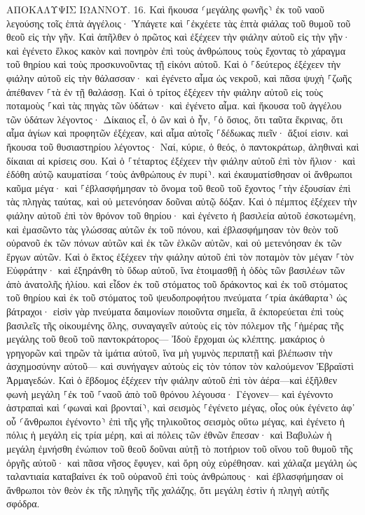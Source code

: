 \documentclass[twoside, 9pt]{extreport}
\begin{document}
ΑΠΟΚΑΛΥΨΙΣ ΙΩΑΝΝΟΥ.
16.
Καὶ ἤκουσα ⸂μεγάλης φωνῆς⸃ ἐκ τοῦ ναοῦ λεγούσης τοῖς ἑπτὰ ἀγγέλοις· Ὑπάγετε καὶ ⸀ἐκχέετε τὰς ἑπτὰ φιάλας τοῦ θυμοῦ τοῦ θεοῦ εἰς τὴν γῆν. 
Καὶ ἀπῆλθεν ὁ πρῶτος καὶ ἐξέχεεν τὴν φιάλην αὐτοῦ εἰς τὴν γῆν· καὶ ἐγένετο ἕλκος κακὸν καὶ πονηρὸν ἐπὶ τοὺς ἀνθρώπους τοὺς ἔχοντας τὸ χάραγμα τοῦ θηρίου καὶ τοὺς προσκυνοῦντας τῇ εἰκόνι αὐτοῦ. 
Καὶ ὁ ⸀δεύτερος ἐξέχεεν τὴν φιάλην αὐτοῦ εἰς τὴν θάλασσαν· καὶ ἐγένετο αἷμα ὡς νεκροῦ, καὶ πᾶσα ψυχὴ ⸀ζωῆς ἀπέθανεν ⸀τὰ ἐν τῇ θαλάσσῃ. 
Καὶ ὁ τρίτος ἐξέχεεν τὴν φιάλην αὐτοῦ εἰς τοὺς ποταμοὺς ⸀καὶ τὰς πηγὰς τῶν ὑδάτων· καὶ ἐγένετο αἷμα. 
καὶ ἤκουσα τοῦ ἀγγέλου τῶν ὑδάτων λέγοντος· Δίκαιος εἶ, ὁ ὢν καὶ ὁ ἦν, ⸀ὁ ὅσιος, ὅτι ταῦτα ἔκρινας, 
ὅτι αἷμα ἁγίων καὶ προφητῶν ἐξέχεαν, καὶ αἷμα αὐτοῖς ⸀δέδωκας πιεῖν· ἄξιοί εἰσιν. 
καὶ ἤκουσα τοῦ θυσιαστηρίου λέγοντος· Ναί, κύριε, ὁ θεός, ὁ παντοκράτωρ, ἀληθιναὶ καὶ δίκαιαι αἱ κρίσεις σου. 
Καὶ ὁ ⸀τέταρτος ἐξέχεεν τὴν φιάλην αὐτοῦ ἐπὶ τὸν ἥλιον· καὶ ἐδόθη αὐτῷ καυματίσαι ⸂τοὺς ἀνθρώπους ἐν πυρί⸃. 
καὶ ἐκαυματίσθησαν οἱ ἄνθρωποι καῦμα μέγα· καὶ ⸀ἐβλασφήμησαν τὸ ὄνομα τοῦ θεοῦ τοῦ ἔχοντος ⸀τὴν ἐξουσίαν ἐπὶ τὰς πληγὰς ταύτας, καὶ οὐ μετενόησαν δοῦναι αὐτῷ δόξαν. 
Καὶ ὁ πέμπτος ἐξέχεεν τὴν φιάλην αὐτοῦ ἐπὶ τὸν θρόνον τοῦ θηρίου· καὶ ἐγένετο ἡ βασιλεία αὐτοῦ ἐσκοτωμένη, καὶ ἐμασῶντο τὰς γλώσσας αὐτῶν ἐκ τοῦ πόνου, 
καὶ ἐβλασφήμησαν τὸν θεὸν τοῦ οὐρανοῦ ἐκ τῶν πόνων αὐτῶν καὶ ἐκ τῶν ἑλκῶν αὐτῶν, καὶ οὐ μετενόησαν ἐκ τῶν ἔργων αὐτῶν. 
Καὶ ὁ ἕκτος ἐξέχεεν τὴν φιάλην αὐτοῦ ἐπὶ τὸν ποταμὸν τὸν μέγαν ⸀τὸν Εὐφράτην· καὶ ἐξηράνθη τὸ ὕδωρ αὐτοῦ, ἵνα ἑτοιμασθῇ ἡ ὁδὸς τῶν βασιλέων τῶν ἀπὸ ἀνατολῆς ἡλίου. 
καὶ εἶδον ἐκ τοῦ στόματος τοῦ δράκοντος καὶ ἐκ τοῦ στόματος τοῦ θηρίου καὶ ἐκ τοῦ στόματος τοῦ ψευδοπροφήτου πνεύματα ⸂τρία ἀκάθαρτα⸃ ὡς βάτραχοι· 
εἰσὶν γὰρ πνεύματα δαιμονίων ποιοῦντα σημεῖα, ἃ ἐκπορεύεται ἐπὶ τοὺς βασιλεῖς τῆς οἰκουμένης ὅλης, συναγαγεῖν αὐτοὺς εἰς τὸν πόλεμον τῆς ⸀ἡμέρας τῆς μεγάλης τοῦ θεοῦ τοῦ παντοκράτορος— 
Ἰδοὺ ἔρχομαι ὡς κλέπτης. μακάριος ὁ γρηγορῶν καὶ τηρῶν τὰ ἱμάτια αὐτοῦ, ἵνα μὴ γυμνὸς περιπατῇ καὶ βλέπωσιν τὴν ἀσχημοσύνην αὐτοῦ— 
καὶ συνήγαγεν αὐτοὺς εἰς τὸν τόπον τὸν καλούμενον Ἑβραϊστὶ Ἁρμαγεδών. 
Καὶ ὁ ἕβδομος ἐξέχεεν τὴν φιάλην αὐτοῦ ἐπὶ τὸν ἀέρα—καὶ ἐξῆλθεν φωνὴ μεγάλη ⸀ἐκ τοῦ ⸀ναοῦ ἀπὸ τοῦ θρόνου λέγουσα· Γέγονεν— 
καὶ ἐγένοντο ἀστραπαὶ καὶ ⸂φωναὶ καὶ βρονταί⸃, καὶ σεισμὸς ⸀ἐγένετο μέγας, οἷος οὐκ ἐγένετο ἀφ᾽ οὗ ⸂ἄνθρωποι ἐγένοντο⸃ ἐπὶ τῆς γῆς τηλικοῦτος σεισμὸς οὕτω μέγας, 
καὶ ἐγένετο ἡ πόλις ἡ μεγάλη εἰς τρία μέρη, καὶ αἱ πόλεις τῶν ἐθνῶν ἔπεσαν· καὶ Βαβυλὼν ἡ μεγάλη ἐμνήσθη ἐνώπιον τοῦ θεοῦ δοῦναι αὐτῇ τὸ ποτήριον τοῦ οἴνου τοῦ θυμοῦ τῆς ὀργῆς αὐτοῦ· 
καὶ πᾶσα νῆσος ἔφυγεν, καὶ ὄρη οὐχ εὑρέθησαν. 
καὶ χάλαζα μεγάλη ὡς ταλαντιαία καταβαίνει ἐκ τοῦ οὐρανοῦ ἐπὶ τοὺς ἀνθρώπους· καὶ ἐβλασφήμησαν οἱ ἄνθρωποι τὸν θεὸν ἐκ τῆς πληγῆς τῆς χαλάζης, ὅτι μεγάλη ἐστὶν ἡ πληγὴ αὐτῆς σφόδρα. 
\end{document}
